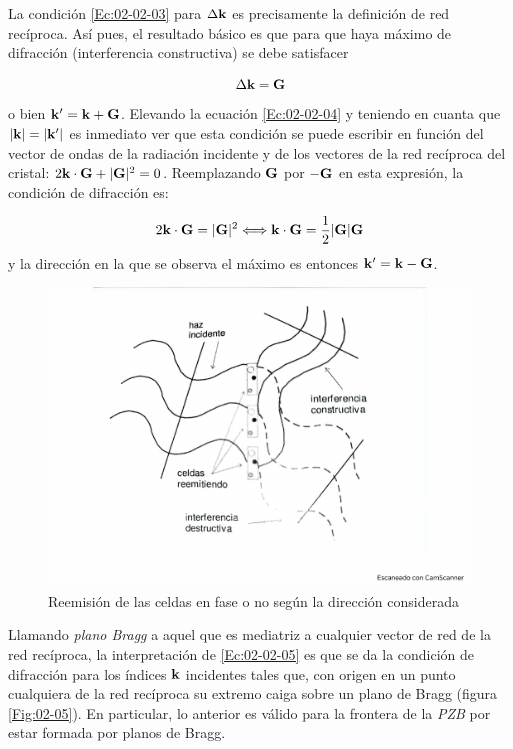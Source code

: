 La condición \ref{Ec:02-02-03} para $\Delta \mathbf{k}$ es precisamente la definición de red recíproca. Así pues, el resultado básico es que para que haya máximo de difracción (interferencia constructiva) se debe satisfacer 


\begin{equation}
    \Delta \mathbf{k} = \mathbf{G}\label{Ec:02-02-04}
\end{equation}
o bien $\mathbf{k}'=\mathbf{k}+\mathbf{G}$. Elevando la ecuación \ref{Ec:02-02-04} y teniendo en cuanta que $|\mathbf{k}|=|\mathbf{k}'|$ es inmediato ver que esta condición se puede escribir en función del vector de ondas de la radiación incidente y de los vectores de la red recíproca del cristal: $2\mathbf{k} \cdot \mathbf{G} + |\mathbf{G}|^2 = 0$. Reemplazando $\mathbf{G}$ por $-\mathbf{G}$ en esta expresión, la condición de difracción es: 

\begin{equation}
    2 \mathbf{k} \cdot \mathbf{G} = |\mathbf{G}|^2 \Longleftrightarrow \mathbf{k} \cdot \mathbf{G} = \frac{1}{2} |\mathbf{G}|  \mathbf{G}\label{Ec:02-02-05}
\end{equation}
y la dirección en la que se observa el máximo es entonces $\mathbf{k}'=\mathbf{k}-\mathbf{G}$. 


\begin{figure}[h!] \centering
    \includegraphics[scale=0.40]{Cuerpo/Ch_02/Fotos_libro 4.pdf}
    \caption{Reemisión de las celdas en fase o no según la dirección considerada}
    \label{Fig:02-04}
\end{figure}

Llamando \textit{plano Bragg} a aquel que es mediatriz a cualquier vector de red de la red recíproca, la interpretación de \ref{Ec:02-02-05} es que se da la condición de difracción para los índices $\mathbf{k}$ incidentes tales que, con origen en un punto cualquiera de la red recíproca su extremo caiga sobre un plano de Bragg (figura \ref{Fig:02-05}). En particular, lo anterior es válido para la frontera de la \textit{PZB} por estar formada por planos de Bragg. 

